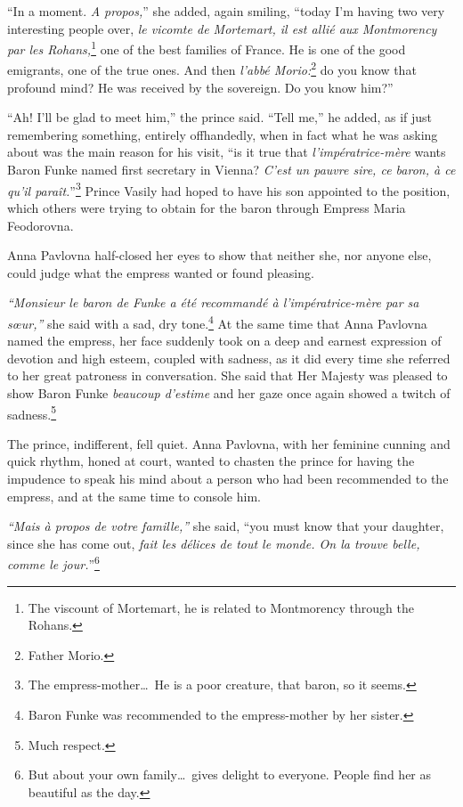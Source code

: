 ``In a moment. \textit{A propos,}'' she added, again smiling, ``today
I'm having two very interesting people over, \textit{le vicomte de
  Mortemart, il est alli\'e aux Montmorency par les
  Rohans,}\footnote{The viscount of Mortemart, he is related to
  Montmorency through the Rohans.} one of the best families of
France. He is one of the good emigrants, one of the true ones. And
then \textit{l'abb\'e Morio:}\footnote{Father Morio.} do you know that
profound mind? He was received by the sovereign. Do you know him?''

``Ah! I'll be glad to meet him,'' the prince said. ``Tell me,'' he
added, as if just remembering something, entirely offhandedly, when in
fact what he was asking about was the main reason for his visit, ``is
it true that \textit{l'imp\'eratrice-m\`ere} wants Baron Funke named
first secretary in Vienna? \textit{C'est un pauvre sire, ce baron, \`a
  ce qu'il para\^it.}''\footnote{The empress-mother\ldots\ He is a
  poor creature, that baron, so it seems.} Prince Vasily had hoped to
have his son appointed to the position, which others were trying to
obtain for the baron through Empress Maria Feodorovna. 

Anna Pavlovna half-closed her eyes to show that neither she, nor
anyone else, could judge what the empress wanted or found pleasing.

\textit{``Monsieur le baron de Funke a \'et\'e recommand\'e \`a
  l'imp\'eratrice-m\`ere par sa s\oe ur,''} she said with a sad, dry
tone.\footnote{Baron Funke was recommended to the empress-mother by
  her sister.} At the same time that Anna Pavlovna named the empress,
her face suddenly took on a deep and earnest expression of devotion
and high esteem, coupled with sadness, as it did every time she
referred to her great patroness in conversation. She said that Her
Majesty was pleased to show Baron Funke \textit{beaucoup d'estime} and
her gaze once again showed a twitch of sadness.\footnote{Much
  respect.}

The prince, indifferent, fell quiet. Anna Pavlovna, with her feminine
cunning and quick rhythm, honed at court, wanted to chasten the prince
for having the impudence to speak his mind about a person who had been
recommended to the empress, and at the same time to console him.

\textit{``Mais \`a propos de votre famille,''} she said, ``you must
know that your daughter, since she has come out, \textit{fait les
  d\'elices de tout le monde. On la trouve belle, comme le
  jour.}''\footnote{But about your own family\ldots\ gives delight to
  everyone. People find her as beautiful as the day.}

